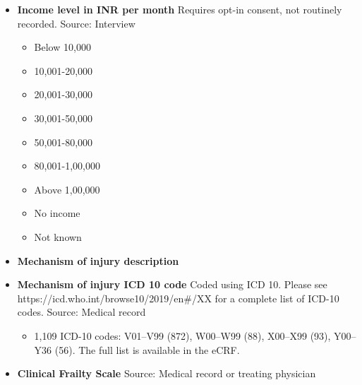 \documentclass[
]{scrartcl}
\providecommand{\tightlist}{%
  \setlength{\itemsep}{0pt}\setlength{\parskip}{0pt}}\usepackage{longtable,booktabs,array}
\begin{document}
\begin{itemize}
  \begin{itemize}
  \tightlist
  \item
    Paid work, such as daily wage earner, teacher, factory worker and
    government employee
  \item
    Self-employed, such as own your business or farming
  \item
    Non-paid work, such as volunteer or charity
  \item
    Student
  \item
    Keeping house/homemaker
  \item
    Retired
  \item
    Unemployed (health reasons)
  \item
    Unemployed (other reasons)
  \item
    Other
  \item
    No income
  \item
    Not known
  \end{itemize}
\item
  \textbf{Income level in INR per month} Requires opt-in consent, not
  routinely recorded. Source: Interview

  \begin{itemize}
  \tightlist
  \item
    Below 10,000
  \item
    10,001-20,000
  \item
    20,001-30,000
  \item
    30,001-50,000
  \item
    50,001-80,000
  \item
    80,001-1,00,000
  \item
    Above 1,00,000
  \item
    No income
  \item
    Not known
  \end{itemize}
\item
  \textbf{Mechanism of injury description}
\item
  \textbf{Mechanism of injury ICD 10 code} Coded using ICD 10. Please
  see https://icd.who.int/browse10/2019/en\#/XX for a complete list of
  ICD-10 codes. Source: Medical record

  \begin{itemize}
  \tightlist
  \item
    1,109 ICD-10 codes: V01--V99 (872), W00--W99 (88), X00--X99 (93),
    Y00--Y36 (56). The full list is available in the eCRF.
  \end{itemize}
\item
  \textbf{Clinical Frailty Scale} Source: Medical record or treating
  physician


\end{itemize}
\end{document}

